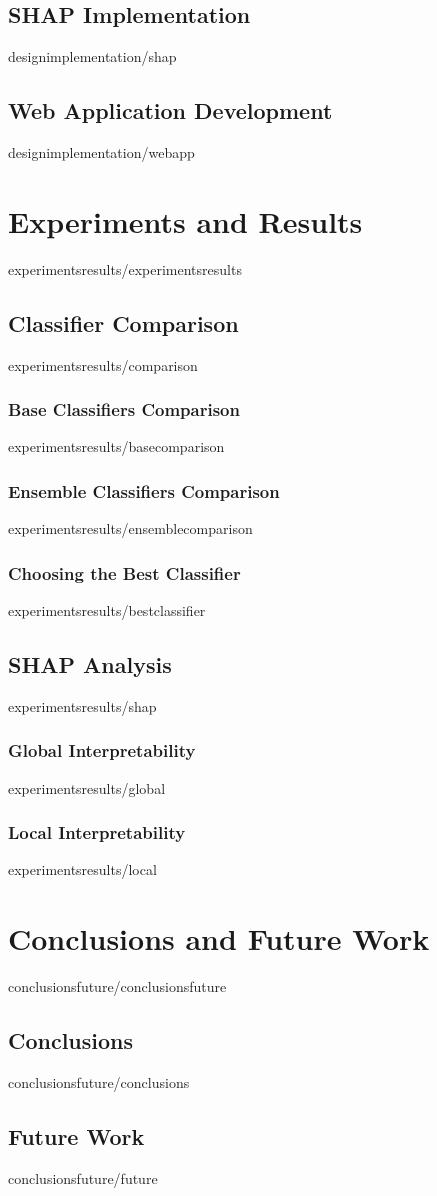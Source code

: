 \documentclass[covers, firstnumbered, tfg, epsbased, english]{tfgtfmthesisuam}
\begin{document}
\section{SHAP Implementation}{designimplementation/shap}
\section{Web Application Development}{designimplementation/webapp}

\chapter{Experiments and Results}{experimentsresults/experimentsresults}
\section{Classifier Comparison}{experimentsresults/comparison}
\subsection{Base Classifiers Comparison}{experimentsresults/basecomparison}
\subsection{Ensemble Classifiers Comparison}{experimentsresults/ensemblecomparison}
\subsection{Choosing the Best Classifier}{experimentsresults/bestclassifier}
\section{SHAP Analysis}{experimentsresults/shap}
\subsection{Global Interpretability}{experimentsresults/global}
\subsection{Local Interpretability}{experimentsresults/local}

\chapter{Conclusions and Future Work}{conclusionsfuture/conclusionsfuture}
\section{Conclusions}{conclusionsfuture/conclusions}
\section{Future Work}{conclusionsfuture/future}

\end{document}

